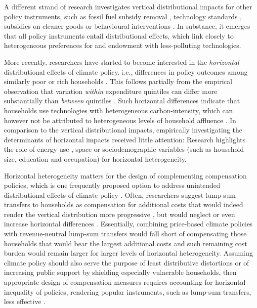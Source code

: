 \documentclass[12pt, a4paper]{article}
\begin{document}
A different strand of research investigates vertical distributional impacts for other policy instruments, such as fossil fuel subsidy removal \autocite{Schaffitzel.2019,Giuliano.2020}, technology standards \autocite{Levinson.2019,Zhao.2022,Bruegge.2019}, subsidies on cleaner goods \autocite{Borenstein.2016,Vaishnav.2017,Winter.2019} or behavioural interventions \autocite{DellaValle.2020,Liebe.2021}. In substance, it emerges that all policy instruments entail distributional effects, which link closely to heterogeneous preferences for and endowment with less-polluting technologies. 

More recently, researchers have started to become interested in the \textit{horizontal} distributional effects of climate policy, i.e., differences in policy outcomes among similarly poor or rich households \autocite{Rausch.2011,Fischer.2019}. This follows partially from the empirical observation that variation \textit{within} expenditure quintiles can differ more substantially than \textit{between} quintiles \autocite{Cronin.2019,Steckel.2021b,Pizer.2019}. Such horizontal differences indicate that households use technologies with heterogeneous carbon-intensity, which can however not be attributed to heterogeneous levels of household affluence \autocite{Hansel.2022}. In comparison to the vertical distributional impacts, empirically investigating the determinants of horizontal impacts received little attention: Research highlights the role of energy use \autocite{Steckel.2021b,Missbach.2024}, space \autocite{Chan.2023,Burtraw.2009} or sociodemographic variables (such as household size, education and occupation) \autocite{Grainger.2010,Buchs.2013,Farrell.2017,Missbach.2023} for horizontal heterogeneity.

Horizontal heterogeneity matters for the design of complementing compensation policies, which is one frequently proposed option to address unintended distributional effects of climate policy \autocite{Klenert.2018,Baranzini.2017}. Often, researchers suggest lump-sum transfers to households as compensation for additional costs that would indeed render the vertical distribution more progressive \autocite{Budolfson.2021,Steckel.2021b,vanderPloeg.2022}, but would neglect or even increase horizontal differences \autocite{Cronin.2019,Hansel.2022}. Essentially, combining price-based climate policies with revenue-neutral lump-sum transfers would fall short of compensating those households that would bear the largest additional costs and such remaining cost burden would remain larger for larger levels of horizontal heterogeneity. Assuming climate policy should also serve the purpose of least distributive distortions \autocite{Fischer.2019} or of increasing public support by shielding especially vulnerable households, then appropriate design of compensation measures requires accounting for horizontal inequality of policies, rendering popular instruments, such as lump-sum transfers, less effective \autocite{Fullerton.2019,Missbach.2024}. 
\end{document}
